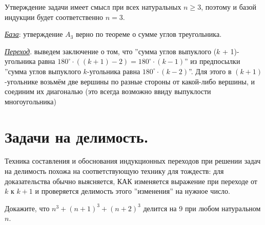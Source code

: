 \begin{prf}
Утверждение задачи имеет смысл при всех натуральных $n \geq 3$, поэтому и базой индукции будет соответственно $n = 3$.
\par
\textit{\underline{База}}: утверждение $A_3$ верно по теореме о сумме углов треугольника.
\par
\textit{\underline{Переход}}. выведем заключение о том, что ''сумма углов выпуклого ($k$ + 1)-угольника равна $180 ^{\circ} \cdot ((k + 1) - 2) = 180 ^{\circ} \cdot (k -1)$'' из предпосылки ''сумма углов выпуклого $k$-угольника равна $180 ^{\circ} \cdot (k - 2)$''. Для этого в $(k + 1)$-угольнике возьмём две вершины по разные стороны от какой-либо вершины, и соединим их диагональю (это всегда возможно ввиду выпуклости многоугольника)\footnotemark
\end{prf}
    
\section{Задачи на делимость.}

Техника составления и обоснования индукционных переходов при решении задач на делимость похожа на соответствующую технику для тождеств: для доказательства обычно выясняется, КАК изменяется выражение при переходе от $k$ к $k + 1$ и проверяется делимость этого ''изменения'' на нужное число.

\begin{thm}
Докажите, что $n^3 + (n + 1)^3 + (n+2)^3$ делится на 9 при любом натуральном $n$.
\end{thm}

